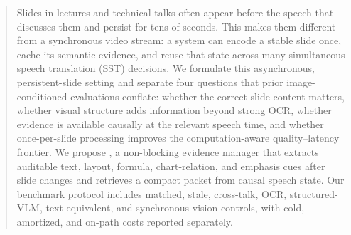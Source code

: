 \begin{abstract}
Slides in lectures and technical talks often appear before the speech that
discusses them and persist for tens of seconds. This makes them different from
a synchronous video stream: a system can encode a stable slide once, cache its
semantic evidence, and reuse that state across many simultaneous speech
translation (SST) decisions. We formulate this asynchronous, persistent-slide
setting and separate four questions that prior image-conditioned evaluations
conflate: whether the correct slide content matters, whether visual structure
adds information beyond strong OCR, whether evidence is available causally at
the relevant speech time, and whether once-per-slide processing improves the
computation-aware quality--latency frontier. We propose \policyname{}, a
non-blocking evidence manager that extracts auditable text, layout, formula,
chart-relation, and emphasis cues after slide changes and retrieves a compact
packet from causal speech state. Our benchmark protocol includes matched,
stale, cross-talk, OCR, structured-VLM, text-equivalent, and synchronous-vision
controls, with cold, amortized, and on-path costs reported separately.
\end{abstract}
